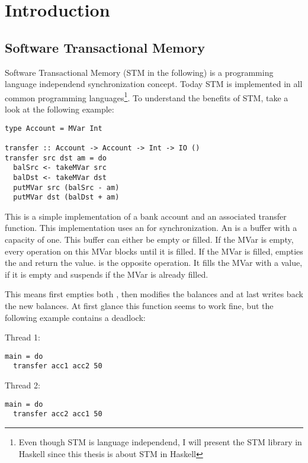 
\chapter{Introduction} 

\label{Chapter1} 

\section{Software Transactional Memory}
\label{STMInterface}
Software Transactional Memory (STM in the following) is a programming language independend synchronization concept. Today STM is implemented 
in all common programming languages\footnote{Even though STM is language independend, I will present the STM library in Haskell since this thesis is
about STM in Haskell}. To understand the benefits of STM, take a look at the following example:
\begin{lstlisting}
type Account = MVar Int

transfer :: Account -> Account -> Int -> IO ()
transfer src dst am = do
  balSrc <- takeMVar src
  balDst <- takeMVar dst
  putMVar src (balSrc - am)
  putMVar dst (balDst + am)
\end{lstlisting}
This is a simple implementation of a bank account and an associated transfer function. This implementation uses an 
for synchronization. An  is a buffer with a capacity of one. This buffer can either be empty or filled. If the MVar is empty,
every  operation on this MVar blocks until it is filled. If the MVar is filled,  empties the 
 and return the value.  is the opposite operation. It fills the MVar with a value, if it is empty and 
suspends if the MVar is already filled.

This means  first empties both , then modifies the balances and at last writes back the new balances.
At first glance this function seems to work fine, but the following example contains a deadlock:
\par\noindent
\begin{minipage}[t]{.45\textwidth}
Thread 1:
\begin{lstlisting}[frame=lrtb]
main = do
  transfer acc1 acc2 50
\end{lstlisting}
\end{minipage}
\hfill
\begin{minipage}[t]{.45\textwidth}
Thread 2:
\begin{lstlisting}[frame=lrtb]
main = do
  transfer acc2 acc1 50
\end{lstlisting}
\end{minipage}

